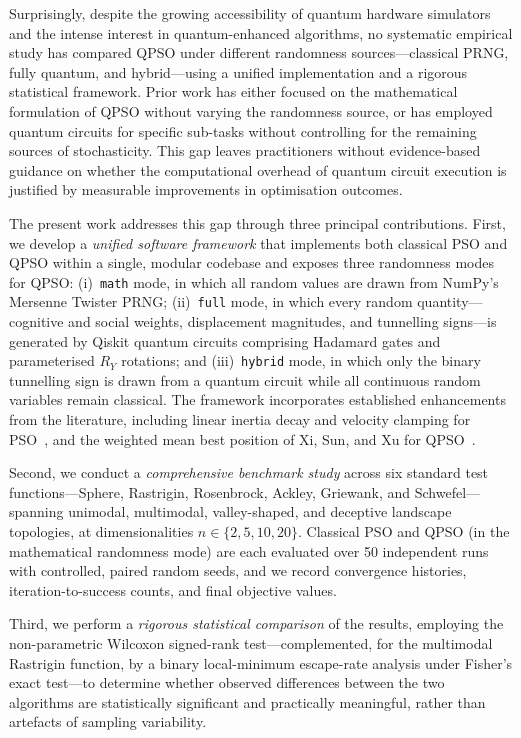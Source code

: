 Surprisingly, despite the growing accessibility of quantum hardware simulators
and the intense interest in quantum-enhanced algorithms, no systematic
empirical study has compared QPSO under different randomness
sources---classical PRNG, fully quantum, and hybrid---using a unified
implementation and a rigorous statistical framework.  Prior work has either
focused on the mathematical formulation of QPSO without varying the randomness
source, or has employed quantum circuits for specific sub-tasks without
controlling for the remaining sources of stochasticity.  This gap leaves
practitioners without evidence-based guidance on whether the computational
overhead of quantum circuit execution is justified by measurable improvements
in optimisation outcomes.

The present work addresses this gap through three principal contributions.
First, we develop a \emph{unified software framework} that implements both
classical PSO and QPSO within a single, modular codebase and exposes three
randomness modes for QPSO: (i)~\texttt{math} mode, in which all random values
are drawn from NumPy's Mersenne Twister PRNG; (ii)~\texttt{full} mode, in
which every random quantity---cognitive and social weights, displacement
magnitudes, and tunnelling signs---is generated by Qiskit quantum circuits
comprising Hadamard gates and parameterised $R_Y$ rotations; and
(iii)~\texttt{hybrid} mode, in which only the binary tunnelling sign is drawn
from a quantum circuit while all continuous random variables remain classical.
The framework incorporates established enhancements from the literature,
including linear inertia decay and velocity clamping for
PSO~\cite{Shi1998,Clerc2002}, and the weighted mean best position of Xi, Sun,
and Xu for QPSO~\cite{Xi2008}.

Second, we conduct a \emph{comprehensive benchmark study} across six standard
test functions---Sphere, Rastrigin, Rosenbrock, Ackley, Griewank, and
Schwefel---spanning unimodal, multimodal, valley-shaped, and deceptive
landscape topologies, at dimensionalities $n \in \{2, 5, 10, 20\}$.  Classical
PSO and QPSO (in the mathematical randomness mode) are each evaluated over 50
independent runs with controlled, paired random seeds, and we record
convergence histories, iteration-to-success counts, and final objective
values.

Third, we perform a \emph{rigorous statistical comparison} of the results,
employing the non-parametric Wilcoxon signed-rank test---complemented, for the
multimodal Rastrigin function, by a binary local-minimum escape-rate analysis
under Fisher's exact test---to determine whether observed differences between
the two algorithms are statistically significant and practically meaningful,
rather than artefacts of sampling variability.

